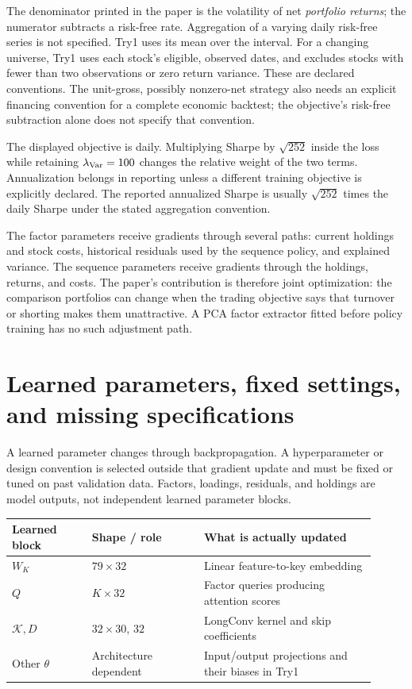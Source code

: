 \documentclass[11pt]{article}
\begin{document}
The denominator printed in the paper is the volatility of net
\emph{portfolio returns}; the numerator subtracts a risk-free rate.
Aggregation of a varying daily risk-free series is not specified. Try1
uses its mean over the interval. For a changing universe, Try1 uses
each stock's eligible, observed dates, and excludes stocks with fewer
than two observations or zero return variance. These are declared
conventions. The unit-gross, possibly nonzero-net strategy also needs
an explicit financing convention for a complete economic backtest;
the objective's risk-free subtraction alone does not specify that
convention.

The displayed objective is daily. Multiplying Sharpe by $\sqrt{252}$
inside the loss while retaining $\lambda_{\rm Var}=100$ changes the
relative weight of the two terms. Annualization belongs in reporting
unless a different training objective is explicitly declared. The
reported annualized Sharpe is usually $\sqrt{252}$ times the daily
Sharpe under the stated aggregation convention.

The factor parameters receive gradients through several paths:
current holdings and stock costs, historical residuals used by the
sequence policy, and explained variance. The sequence parameters
receive gradients through the holdings, returns, and costs. The
paper's contribution is therefore joint optimization: the comparison
portfolios can change when the trading objective says that turnover
or shorting makes them unattractive. A PCA factor extractor fitted
before policy training has no such adjustment path.

\section{Learned parameters, fixed settings, and missing specifications}
\label{sec:parameter-audit}

A learned parameter changes through backpropagation. A hyperparameter
or design convention is selected outside that gradient update and
must be fixed or tuned on past validation data. Factors, loadings,
residuals, and holdings are model outputs, not independent learned
parameter blocks.

\begin{center}
\small
\begin{tabular}{p{0.20\linewidth}p{0.28\linewidth}p{0.43\linewidth}}
\toprule
Learned block & Shape / role & What is actually updated\\
\midrule
$W_K$ & $79\times32$ & Linear feature-to-key embedding\\
$Q$ & $K\times32$ & Factor queries producing attention scores\\
$\mathcal K,D$ & $32\times30$, $32$ & LongConv kernel and skip coefficients\\
Other $\theta$ & Architecture dependent & Input/output projections and their biases in Try1\\
\bottomrule
\end{tabular}
\end{center}
\end{document}
